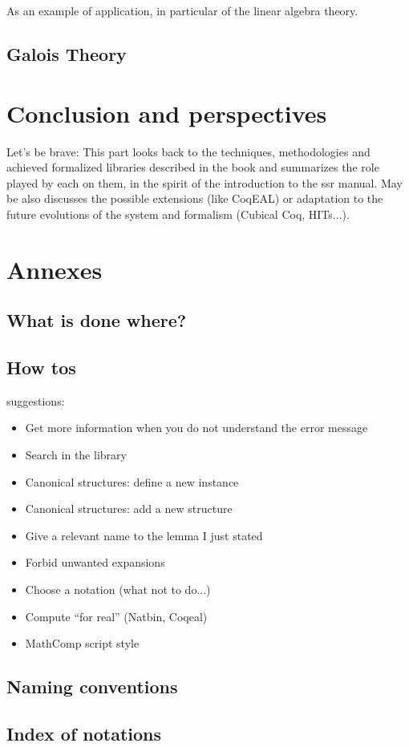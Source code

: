 \documentclass{book}
\begin{document}
As an example of application, in particular of the linear algebra
theory.

\chapter{Galois Theory}




\part{Conclusion and perspectives}

Let's be brave:
This part looks back to the techniques, methodologies and achieved
formalized libraries described in the book and summarizes the role
played by each on them, in the spirit of the introduction to the ssr manual.
May be also discusses the possible extensions
(like CoqEAL) or adaptation to the future evolutions of the system and
formalism (Cubical Coq, HITs...).

\part{Annexes}


\chapter{What is done where?}

\chapter{How tos}
suggestions:
\begin{itemize}
\item Get more information when you do not understand the error
  message
\item Search in the library
\item Canonical structures: define a new instance
\item Canonical structures: add a new structure
\item Give a relevant name to the lemma I just stated
\item Forbid unwanted expansions
\item Choose a notation (what not to do...)
\item Compute ``for real'' (Natbin, Coqeal)
\item MathComp script style
\end{itemize}

\chapter{Naming conventions}

\chapter{Index of notations}



\end{document}
